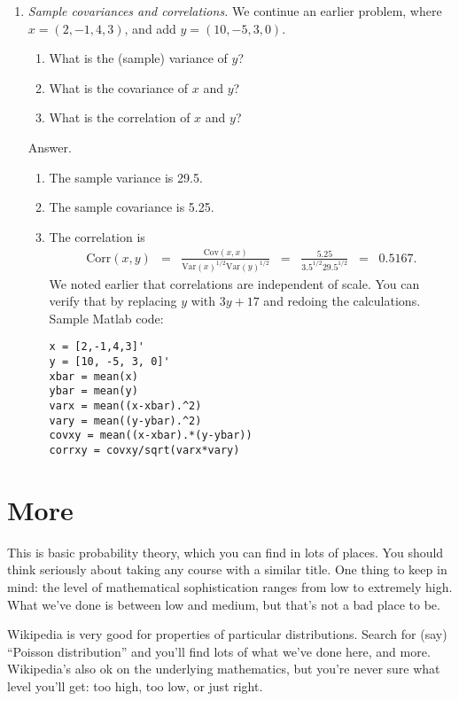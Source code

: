 \documentclass[11pt]{article}
\begin{document}
\begin{enumerate}
\item {\it Sample covariances and correlations.\/}
We continue an earlier problem, where $ x= (2,-1,4,3)$,
and add $y = (10,-5, 3, 0)$.
\begin{enumerate}
\item What is the (sample) variance of $y$?
\item What is the covariance of $x$ and $y$?
\item What is the correlation of $x$ and $y$?
\end{enumerate}

Answer.
\begin{enumerate}
\item The sample variance is 29.5.
\item The sample covariance is 5.25.
\item The correlation is
\begin{eqnarray*}
    \mbox{Corr}(x,y) &=&
            \frac {\mbox{Cov}(x,x)} {\mbox{Var}(x)^{1/2} \mbox{Var}(y)^{1/2} }
            \;\;=\;\; \frac{ 5.25} {3.5^{1/2} 29.5^{1/2}}
            \;\;=\;\; 0.5167 .
\end{eqnarray*}
We noted earlier that correlations are independent of scale.
You can verify that by replacing $y$ with $ 3y+17$ and redoing the calculations.
Sample Matlab code:
\begin{verbatim}
x = [2,-1,4,3]'
y = [10, -5, 3, 0]'
xbar = mean(x)
ybar = mean(y)
varx = mean((x-xbar).^2)
vary = mean((y-ybar).^2)
covxy = mean((x-xbar).*(y-ybar))
corrxy = covxy/sqrt(varx*vary)
\end{verbatim}
\end{enumerate}

\end{enumerate}


\section*{More}

This is basic probability theory, which you can find in lots of places.
You should think seriously about taking any course with a similar title.
One thing to keep in mind:
the level of mathematical sophistication ranges from low to extremely high.
What we've done is between low and medium, but that's not a bad place to be.

Wikipedia is very good for properties of particular distributions.
Search for (say) ``Poisson distribution'' and you'll find lots of what we've done here,
and more.
Wikipedia's also ok on the underlying mathematics, but you're never sure what
level you'll get:  too high, too low, or just right.


\end{document}
